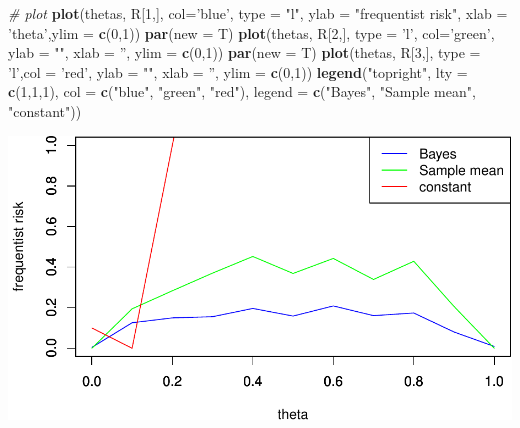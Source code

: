 \documentclass[
]{article}
\newenvironment{Shaded}{\begin{snugshade}}{\end{snugshade}}
\newcommand{\CommentTok}[1]{\textcolor[rgb]{0.56,0.35,0.01}{\textit{#1}}}
\newcommand{\DataTypeTok}[1]{\textcolor[rgb]{0.13,0.29,0.53}{#1}}
\newcommand{\DecValTok}[1]{\textcolor[rgb]{0.00,0.00,0.81}{#1}}
\newcommand{\KeywordTok}[1]{\textcolor[rgb]{0.13,0.29,0.53}{\textbf{#1}}}
\newcommand{\NormalTok}[1]{#1}
\newcommand{\StringTok}[1]{\textcolor[rgb]{0.31,0.60,0.02}{#1}}
\begin{document}
\begin{Shaded}
\begin{Highlighting}[]
\CommentTok{# plot}
\KeywordTok{plot}\NormalTok{(thetas, R[}\DecValTok{1}\NormalTok{,], }\DataTypeTok{col=}\StringTok{'blue'}\NormalTok{, }\DataTypeTok{type =} \StringTok{"l"}\NormalTok{, }
     \DataTypeTok{ylab =} \StringTok{"frequentist risk"}\NormalTok{, }\DataTypeTok{xlab =} \StringTok{'theta'}\NormalTok{,}\DataTypeTok{ylim =} \KeywordTok{c}\NormalTok{(}\DecValTok{0}\NormalTok{,}\DecValTok{1}\NormalTok{))}
\KeywordTok{par}\NormalTok{(}\DataTypeTok{new =}\NormalTok{ T)}
\KeywordTok{plot}\NormalTok{(thetas, R[}\DecValTok{2}\NormalTok{,], }\DataTypeTok{type =} \StringTok{'l'}\NormalTok{, }\DataTypeTok{col=}\StringTok{'green'}\NormalTok{, }
     \DataTypeTok{ylab =} \StringTok{""}\NormalTok{, }\DataTypeTok{xlab =} \StringTok{''}\NormalTok{, }\DataTypeTok{ylim =} \KeywordTok{c}\NormalTok{(}\DecValTok{0}\NormalTok{,}\DecValTok{1}\NormalTok{))}
\KeywordTok{par}\NormalTok{(}\DataTypeTok{new =}\NormalTok{ T)}
\KeywordTok{plot}\NormalTok{(thetas, R[}\DecValTok{3}\NormalTok{,], }\DataTypeTok{type =} \StringTok{'l'}\NormalTok{,}\DataTypeTok{col =} \StringTok{'red'}\NormalTok{,}
     \DataTypeTok{ylab =} \StringTok{""}\NormalTok{, }\DataTypeTok{xlab =} \StringTok{''}\NormalTok{, }\DataTypeTok{ylim =} \KeywordTok{c}\NormalTok{(}\DecValTok{0}\NormalTok{,}\DecValTok{1}\NormalTok{))}
\KeywordTok{legend}\NormalTok{(}\StringTok{"topright"}\NormalTok{, }\DataTypeTok{lty =} \KeywordTok{c}\NormalTok{(}\DecValTok{1}\NormalTok{,}\DecValTok{1}\NormalTok{,}\DecValTok{1}\NormalTok{), }\DataTypeTok{col =} \KeywordTok{c}\NormalTok{(}\StringTok{"blue"}\NormalTok{, }\StringTok{"green"}\NormalTok{, }\StringTok{"red"}\NormalTok{),}
       \DataTypeTok{legend =} \KeywordTok{c}\NormalTok{(}\StringTok{"Bayes"}\NormalTok{, }\StringTok{"Sample mean"}\NormalTok{, }\StringTok{"constant"}\NormalTok{))}
\end{Highlighting}
\end{Shaded}

\includegraphics{lab-03_files/figure-latex/unnamed-chunk-7-1.pdf}
\end{document}
